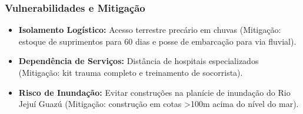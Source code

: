 \subsubsection{Vulnerabilidades e
Mitigação}

\begin{itemize}
\tightlist
\item
  \textbf{Isolamento Logístico:} Acesso terrestre precário em chuvas
  (Mitigação: estoque de suprimentos para 60 dias e posse de embarcação
  para via fluvial).
\item
  \textbf{Dependência de Serviços:} Distância de hospitais
  especializados (Mitigação: kit trauma completo e treinamento de
  socorrista).
\item
  \textbf{Risco de Inundação:} Evitar construções na planície de
  inundação do Rio Jejuí Guazú (Mitigação: construção em cotas
  \textgreater100m acima do nível do mar).
\end{itemize}

